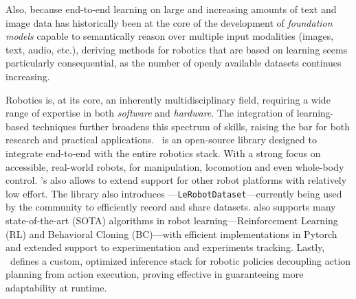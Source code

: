 Also, because end-to-end learning on large and increasing amounts of text and image data has historically been at the core of the development of \emph{foundation models} capable to semantically reason over multiple input modalities (images, text, audio, etc.), deriving methods for robotics that are based on learning seems particularly consequential, as the number of openly available datasets continues increasing.

Robotics is, at its core, an inherently multidisciplinary field, requiring a wide range of expertise in both \emph{software} and \emph{hardware}.
The integration of learning-based techniques further broadens this spectrum of skills, raising the bar for both research and practical applications.
\lerobot~is an open-source library designed to integrate end-to-end with the entire robotics stack.
With a strong focus on accessible, real-world robots,  for manipulation, locomotion and even whole-body control.
\lerobot's  also allows to extend support for other robot platforms with relatively low effort. 
The library also introduces ---\texttt{LeRobotDataset}---currently being used by the community to efficiently record and share datasets. 
\lerobot also supports many state-of-the-art (SOTA) algorithms in robot learning---Reinforcement Learning (RL) and Behavioral Cloning (BC)---with efficient implementations in Pytorch and extended support to experimentation and experiments tracking.
Lastly, \lerobot~defines a custom, optimized inference stack for robotic policies decoupling action planning from action execution, proving effective in guaranteeing more adaptability at runtime.

